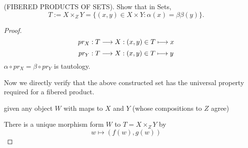 \documentclass[11pt]{book} %
\begin{document}
\begin{exr}
(FIBERED PRODUCTS OF SETS). Show that in Sets,
$$
T:=X\times_Z Y=\{(x,y)\in X\times Y : \alpha(x)=β\beta(y)\}.$$
\end{exr}
\begin{proof}
$$
pr_X:T\longrightarrow X:(x,y)\in T\longmapsto x
$$
$$
pr_Y:T\longrightarrow X:(x,y)\in T\longmapsto y
$$
$\alpha\circ pr_X=\beta\circ pr_Y$ is tautology.

Now we directly verify that the above constructed set has the universal property required for a fibered product.
\begin{center}
\end{center}
given any object $W $ with maps to $X$ and $Y$ (whose compositions to $Z$ agree)

There is a unique morphism form $W$ to $T=X\times_Z Y$ by 
$$
w\longmapsto (f(w), g(w))
$$
\end{proof}
\end{document}
